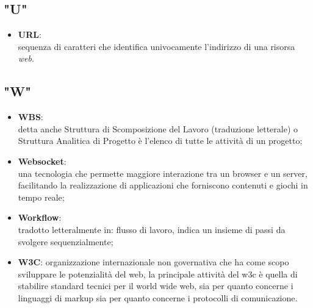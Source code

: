 \subsection*{"U"}
\begin{itemize}
\itemsep2em
\item \textbf{URL}:\\ sequenza di caratteri che identifica univocamente l'indirizzo di una risorsa \textit{web}.
\end{itemize}

\subsection*{"W"}
\begin{itemize}
\itemsep2em

\item \textbf{WBS}:\\ detta anche Struttura di Scomposizione del Lavoro (traduzione letterale) o Struttura Analitica di Progetto è l'elenco di tutte le attività di un progetto;
\item \textbf{Websocket}:\\una tecnologia che permette maggiore interazione tra un browser e un server, facilitando la realizzazione di applicazioni che forniscono contenuti e giochi in tempo reale;
\item \textbf{Workflow}:\\ tradotto letteralmente in: flusso di lavoro, indica un insieme di passi da svolgere sequenzialmente;
\item \textbf{W3C}: organizzazione internazionale non governativa che ha come scopo sviluppare le potenzialità del web, la principale attività del w3c è quella di stabilire standard tecnici per il world wide web, sia per quanto concerne i linguaggi di markup sia per quanto concerne i protocolli di comunicazione.
\end{itemize}

